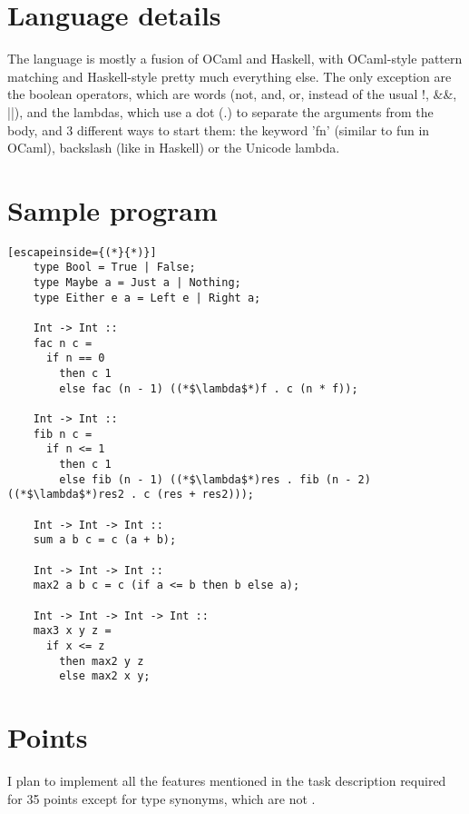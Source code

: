 \documentclass{article}
\begin{document}
	\section{Language details}
	The language is mostly a fusion of OCaml and Haskell, with OCaml-style pattern matching and
	Haskell-style pretty much everything else. The only exception are the boolean operators,
	which are words (not, and, or, instead of the usual !, \&\&, ||), and the lambdas, which
	use a dot (.) to separate the arguments from the body, and 3 different ways to start them:
	the keyword 'fn' (similar to fun in OCaml), backslash (like in Haskell) or the Unicode lambda.
	\section{Sample program}
	\begin{lstlisting}[escapeinside={(*}{*)}]
	type Bool = True | False;
	type Maybe a = Just a | Nothing;
	type Either e a = Left e | Right a;
	
	Int -> Int ::
	fac n c =
	  if n == 0
	    then c 1
		else fac (n - 1) ((*$\lambda$*)f . c (n * f));
	
	Int -> Int ::
	fib n c =
	  if n <= 1
		then c 1
		else fib (n - 1) ((*$\lambda$*)res . fib (n - 2) ((*$\lambda$*)res2 . c (res + res2)));
	
	Int -> Int -> Int ::
	sum a b c = c (a + b);
	
	Int -> Int -> Int ::
	max2 a b c = c (if a <= b then b else a);
	
	Int -> Int -> Int -> Int ::
	max3 x y z =
	  if x <= z
		then max2 y z
		else max2 x y;
	\end{lstlisting}
	\section{Points}
	I plan to implement all the features mentioned in the task description required for 35 points except
	for type synonyms, which are not .
\end{document}
